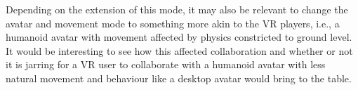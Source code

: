 Depending on the extension of this mode, it may also be relevant to change the avatar and movement mode to something more akin to the VR players, i.e., a humanoid avatar with movement affected by physics constricted to ground level. It would be interesting to see how this affected collaboration and whether or not it is jarring for a VR user to collaborate with a humanoid avatar with less natural movement and behaviour like a desktop avatar would bring to the table.

\cleardoublepage